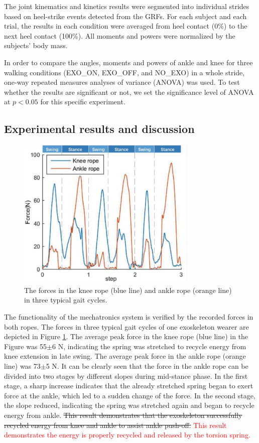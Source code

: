 \documentclass[twocolumn,cleanfoot,10pt]{asme2ej}
\begin{document}
The joint kinematics and kinetics results were segmented into individual strides based on heel-strike events detected from the GRFs. For each subject and each trial, the results in each condition were averaged from heel contact (0\%) to the next heel contact (100\%). All moments and powers were normalized by the subjects’ body mass.

In order to compare the angles, moments and powers of ankle and knee for three walking conditions (EXO\_ON, EXO\_OFF, and NO\_EXO) in a whole stride, one-way repeated measures analyses of variance (ANOVA) was used. To test whether the results are significant or not, we set the significance level of ANOVA at $p<0.05$ for this specific experiment. 

\subsection{Experimental results and discussion}

\begin{figure}[b]
	\centering
	\includegraphics[width=8.5cm]{forces.eps}
	\caption{The forces in the knee rope (blue line) and ankle rope (orange line) in three typical gait cycles.}
	\label{fig:force}
\end{figure}


The functionality of the mechatronics system is verified by the recorded forces in both ropes. The forces in three typical gait cycles of one exoskeleton wearer are depicted in Figure \ref{fig:force}. The average peak force in the knee rope (blue line) in the Figure was 55$\pm$6 N, indicating the spring was stretched to recycle energy from knee extension in late swing. The average peak force in the ankle rope (orange line) was 73$\pm$5 N. It can be clearly seen that the force in the ankle rope can be divided into two stages by different slopes during mid-stance phase. In the first stage, a sharp increase indicates that the already stretched spring began to exert force at the ankle, which led to a sudden change of the force. In the second stage, the slope reduced, indicating the spring was stretched again and began to recycle energy from ankle. \sout{This result demonstrates that the exoskeleton successfully recycled energy from knee and ankle to assist ankle push-off.} \textcolor{red}{This result demonstrates the energy is properly recycled and released by the torsion spring.}
\end{document}
